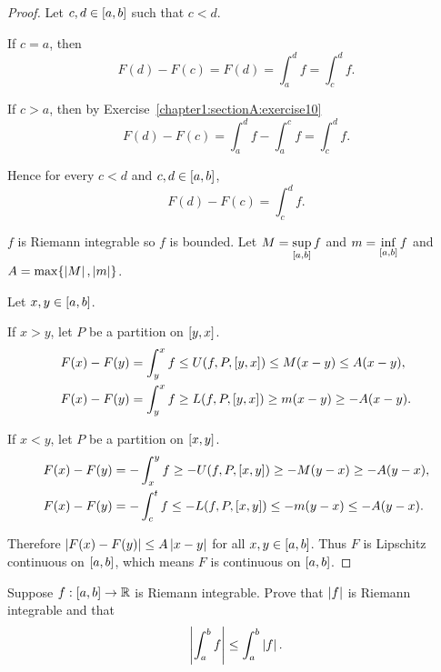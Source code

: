 \begin{proof}
    Let $c, d\in\left[{a, b}\right]$ such that $c < d$.

    If $c = a$, then
    \[
        F(d) - F(c) = F(d) = \int^{d}_{a}f = \int^{d}_{c}f.
    \]

    If $c > a$, then by Exercise~\ref{chapter1:sectionA:exercise10}
    \[
        F(d) - F(c) = \int^{d}_{a}f - \int^{c}_{a}f = \int^{d}_{c}f.
    \]

    Hence for every $c < d$ and $c, d\in\left[{a, b}\right]$,
    \[
        F(d) - F(c) = \int^{d}_{c}f.
    \]


    $f$ is Riemann integrable so $f$ is bounded. Let $M = \sup\limits_{\left[{a, b}\right]}f$ and $m = \inf\limits_{\left[{a, b}\right]}f$ and $A = \max\{ \left\vert{M}\right\vert, \left\vert{m}\right\vert \}$.

    Let $x, y\in\left[{a, b}\right]$.

    If $x > y$, let $P$ be a partition on $\left[{y, x}\right]$.
    \begin{align*}
        F(x) - F(y) & = \int^{x}_{y}f \leq U(f, P, \left[{y, x}\right]) \leq M(x - y) \leq A(x - y),  \\
        F(x) - F(y) & = \int^{x}_{y}f \geq L(f, P, \left[{y, x}\right]) \geq m(x - y) \geq -A(x - y).
    \end{align*}

    If $x < y$, let $P$ be a partition on $\left[{x, y}\right]$.
    \begin{align*}
        F(x) - F(y) & = -\int^{y}_{x}f \geq -U(f, P, \left[{x, y}\right]) \geq -M(y - x) \geq -A(y - x), \\
        F(x) - F(y) & = -\int^{t}_{c}f \leq -L(f, P, \left[{x, y}\right]) \leq -m(y - x) \leq -A(y - x).
    \end{align*}

    Therefore $\left\vert{F(x) - F(y)}\right\vert \leq A\left\vert{x - y}\right\vert$ for all $x, y\in\left[{a, b}\right]$. Thus $F$ is Lipschitz continuous on $\left[{a, b}\right]$, which means $F$ is continuous on $\left[{a, b}\right]$.
\end{proof}
\newpage

\begin{exercise}\label{chapter1:sectionA:exercise12}
    Suppose $f: \left[{a, b}\right]\to\mathbb{R}$ is Riemann integrable. Prove that $\left\vert{f}\right\vert$ is Riemann integrable and that
    \[
        \left\vert{\int^{b}_{a}f}\right\vert \leq \int^{b}_{a}\left\vert{f}\right\vert.
    \]
\end{exercise}

